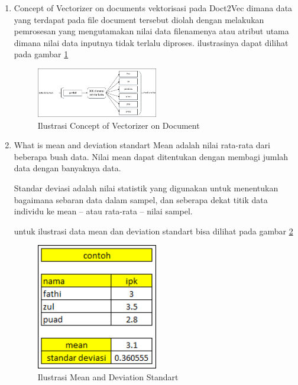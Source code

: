 \begin{enumerate}
\item Concept of Vectorizer on documents
\subitem vektorisasi pada Doct2Vec dimana data yang terdapat pada file document tersebut diolah dengan melakukan pemrosesan yang mengutamakan nilai data filenamenya atau atribut utama dimana nilai data inputnya tidak terlalu diproses. ilustrasinya dapat dilihat pada gambar \ref{d4}
\begin{figure}[!htbp]
	\centering
	\includegraphics[width=0.5\textwidth]{figures/fathi/chapter5/hari1/4}
	\caption{Ilustrasi Concept of Vectorizer on Document}
	\label{d4}
\end{figure}

\item What is mean and deviation standart
\subitem Mean adalah nilai rata-rata dari beberapa buah data. Nilai mean dapat ditentukan dengan membagi jumlah data dengan banyaknya data.

\subitem Standar deviasi adalah nilai statistik yang digunakan untuk menentukan bagaimana sebaran data dalam sampel, dan seberapa dekat titik data individu ke mean – atau rata-rata – nilai sampel.

untuk ilustrasi data mean dan deviation standart bisa dilihat pada gambar \ref{d5}
\begin{figure}[!htbp]
	\centering
	\includegraphics[width=0.5\textwidth]{figures/fathi/chapter5/hari1/5}
	\caption{Ilustrasi Mean and Deviation Standart}
	\label{d5}
\end{figure}


\end{enumerate}
